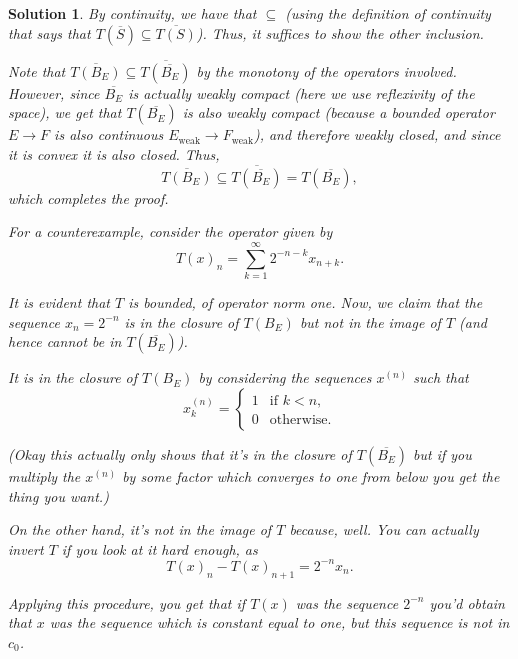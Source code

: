 \documentclass{article}
\theoremstyle{nonumberplain}
\newtheorem{sol}{Solution}
\newcommand{\closed}[1]{\overline{#1}}
\begin{document}
\begin{sol}
\item By continuity, we have that $\subseteq$ (using the definition of continuity that says that $T(\closed S) \subseteq \closed{T(S)}$). Thus, it suffices to show the other inclusion.

Note that $\closed{T(B_E)} \subseteq \closed{T(\closed{B_E})}$ by the monotony of the operators involved. However, since $\closed{B_E}$ is actually weakly compact (here we use reflexivity of the space), we get that $T(\closed{B_E})$ is also weakly compact (because a bounded operator $E \to F$ is also continuous $E_{\text{weak}} \to F_{\text{weak}}$), and therefore weakly closed, and since it is convex it is also closed. Thus,
\begin{equation}
\closed{T(B_E)} \subseteq \closed{T(\closed{B_E})} = T(\closed{B_E}),
\end{equation}
which completes the proof.

\smallskip

For a counterexample, consider the operator given by
\begin{equation}
T(x)_n = \sum_{k = 1}^\infty 2^{-n-k} x_{n+k}.
\end{equation}

It is evident that $T$ is bounded, of operator norm one. Now, we claim that the sequence $x_n = 2^{-n}$ is in the closure of $T(B_E)$ but not in the image of $T$ (and hence cannot be in $T(\closed{B_E})$).

It is in the closure of $T(B_E)$ by considering the sequences $x^{(n)}$ such that
\begin{equation}
x^{(n)}_k = \begin{cases}
1 & \text{if $k < n$,}\\
0 & \text{otherwise.}
\end{cases}
\end{equation}

(Okay this actually only shows that it's in the closure of $T(\closed{B_E})$ but if you multiply the $x^{(n)}$ by some factor which converges to one from below you get the thing you want.)

On the other hand, it's not in the image of $T$ because, well. You can actually invert $T$ if you look at it hard enough, as
\begin{equation}
T(x)_n - T(x)_{n+1} = 2^{-n} x_n.
\end{equation}

Applying this procedure, you get that if $T(x)$ was the sequence $2^{-n}$ you'd obtain that $x$ was the sequence which is constant equal to one, but this sequence is not in $c_0$.


\end{sol}
\end{document}
